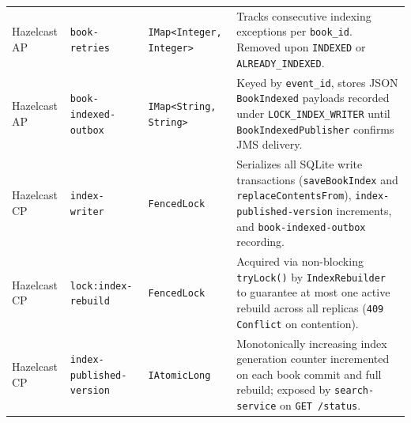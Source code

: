 \documentclass[10pt,a4paper]{article}
\begin{document}
\begin{table}[!htbp]
\begin{tabularx}{\textwidth}{L{2.1cm} L{3.1cm} L{2.8cm} Y}
Hazelcast AP & \texttt{book-retries} & \texttt{IMap<Integer, Integer>} & Tracks consecutive indexing exceptions per \texttt{book\_id}. Removed upon \texttt{INDEXED} or \texttt{ALREADY\_INDEXED}. \\
Hazelcast AP & \texttt{book-indexed-outbox} & \texttt{IMap<String, String>} & Keyed by \texttt{event\_id}, stores JSON \texttt{BookIndexed} payloads recorded under \texttt{LOCK\_INDEX\_WRITER} until \texttt{BookIndexedPublisher} confirms JMS delivery. \\
Hazelcast CP & \texttt{index-writer} & \texttt{FencedLock} & Serializes all SQLite write transactions (\texttt{saveBookIndex} and \texttt{replaceContentsFrom}), \texttt{index-published-version} increments, and \texttt{book-indexed-outbox} recording. \\
Hazelcast CP & \texttt{lock:index-rebuild} & \texttt{FencedLock} & Acquired via non-blocking \texttt{tryLock()} by \texttt{IndexRebuilder} to guarantee at most one active rebuild across all replicas (\texttt{409 Conflict} on contention). \\
Hazelcast CP & \texttt{index-published-version} & \texttt{IAtomicLong} & Monotonically increasing index generation counter incremented on each book commit and full rebuild; exposed by \texttt{search-service} on \texttt{GET /status}. \\
\bottomrule
\end{tabularx}
\end{table}
\end{document}
